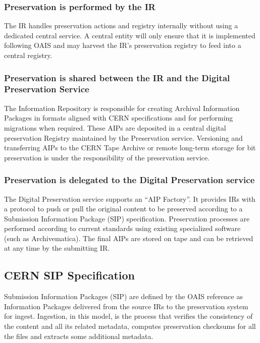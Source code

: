 \documentclass[11pt]{IEEEtran}
\begin{document}
\subsubsection{Preservation is performed by the IR} The IR handles preservation actions and registry internally without using a dedicated central service. A central entity will only ensure that it is implemented following OAIS and may harvest the IR's preservation registry to feed into a central registry.

\subsubsection{Preservation is shared between the IR and the Digital Preservation Service}

The Information Repository is responsible for creating Archival Information Packages in formats aligned with CERN specifications and for performing migrations when required. These AIPs are deposited in a central digital preservation Registry maintained by the Preservation service. Versioning and transferring AIPs to the CERN Tape Archive or remote long-term storage for bit preservation is under the responsibility of the preservation service. 

\subsubsection{Preservation is delegated to the Digital Preservation service}

The Digital Preservation service supports an “AIP Factory”. It provides IRs with a protocol to push or pull the original content to be preserved according to a Submission Information Package (SIP) specification. Preservation processes are performed according to current standards using existing specialized software (such as Archivematica). The final AIPs are stored on tape and can be retrieved at any time by the submitting IR. 

\subsection{CERN SIP Specification}

Submission Information Packages (SIP) are defined by the OAIS reference as Information Packages  delivered from the source IRs to the preservation system for ingest. Ingestion, in this model, is the process that verifies the consistency of the content and all its related metadata, computes preservation checksums for all the files and extracts some additional metadata.
\end{document}
